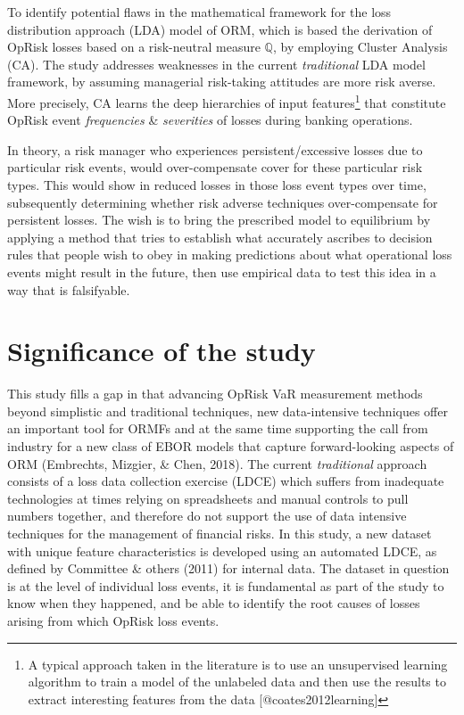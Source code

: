 \documentclass{DissertateUSU}
\begin{document}
To identify potential flaws in the mathematical framework for the loss
distribution approach (LDA) model of ORM, which is based the derivation
of OpRisk losses based on a risk-neutral measure \(\mathbb{Q}\), by
employing Cluster Analysis (CA). The study addresses weaknesses in the
current \emph{traditional} LDA model framework, by assuming managerial
risk-taking attitudes are more risk averse. More precisely, CA learns
the deep hierarchies of input
features\footnote{A typical approach taken in the literature is to use an unsupervised learning algorithm to train a model of the unlabeled data and then use the results to extract interesting features from the data [@coates2012learning]}
that constitute OpRisk event \emph{frequencies} \& \emph{severities} of
losses during banking operations.\medskip

In theory, a risk manager who experiences persistent/excessive losses
due to particular risk events, would over-compensate cover for these
particular risk types. This would show in reduced losses in those loss
event types over time, subsequently determining whether risk adverse
techniques over-compensate for persistent losses. The wish is to bring
the prescribed model to equilibrium by applying a method that tries to
establish what accurately ascribes to decision rules that people wish to
obey in making predictions about what operational loss events might
result in the future, then use empirical data to test this idea in a way
that is falsifyable.

\section{Significance of the study}
\label{sec:Significance of the study}

This study fills a gap in that advancing OpRisk VaR measurement methods
beyond simplistic and traditional techniques, new data-intensive
techniques offer an important tool for ORMFs and at the same time
supporting the call from industry for a new class of EBOR models that
capture forward-looking aspects of ORM (Embrechts, Mizgier, \& Chen,
2018). The current \emph{traditional} approach consists of a loss data
collection exercise (LDCE) which suffers from inadequate technologies at
times relying on spreadsheets and manual controls to pull numbers
together, and therefore do not support the use of data intensive
techniques for the management of financial risks. In this study, a new
dataset with unique feature characteristics is developed using an
automated LDCE, as defined by Committee \& others (2011) for internal
data. The dataset in question is at the level of individual loss events,
it is fundamental as part of the study to know when they happened, and
be able to identify the root causes of losses arising from which OpRisk
loss events.\medskip 
\end{document}
